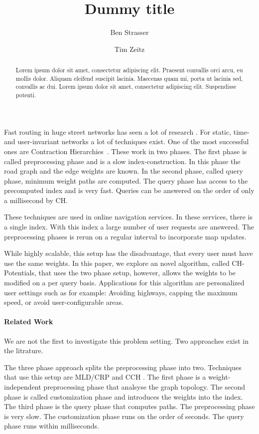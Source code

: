 \documentclass[a4paper,UKenglish,cleveref, autoref]{lipics-v2019}
\title{Dummy title} %
\author{Ben Strasser}{Dummy University Computing Laboratory, [optional: Address], Country \and My second affiliation, Country \and \url{http://www.myhomepage.edu} }{johnqpublic@dummyuni.org}{https://orcid.org/0000-0002-1825-0097}{(Optional) author-specific funding acknowledgements}%
\author{Tim Zeitz}{Institute of Theoretical Informatics, Algorithmics I, Karlsruhe Institute of Technology, Germany}{tim.zeitz@kit.edu}{}{}
\begin{document}
\maketitle

\begin{abstract}
Lorem ipsum dolor sit amet, consectetur adipiscing elit. Praesent convallis orci arcu, eu mollis dolor. Aliquam eleifend suscipit lacinia. Maecenas quam mi, porta ut lacinia sed, convallis ac dui. Lorem ipsum dolor sit amet, consectetur adipiscing elit. Suspendisse potenti.
\end{abstract}

Fast routing in huge street networks has seen a lot of research \cite{Survey}.
For static, time- and user-invariant networks a lot of techniques exist. 
One of the most successful ones are Contraction Hierarchies~\cite{CH}.
These work in two phases.
The first phase is called preprocessing phase and is a slow index-construction.
In this phase the road graph and the edge weights are known.
In the second phase, called query phase, minimum weight paths are computed.
The query phase has access to the precomputed index and is very fast.
Queries can be answered on the order of only a millisecond by CH.

These techniques are used in online navigation services. 
In these services, there is a single index.
With this index a large number of user requests are answered.
The preprocessing phases is rerun on a regular interval to incorporate map updates.

While highly scalable, this setup has the disadvantage, that every user must have use the same weights.
In this paper, we explore an novel algorithm, called CH-Potentials, that uses the two phase setup, however, allows the weights to be modified on a per query basis.
Applications for this algorithm are personalized user settings such as for example:
Avoiding highways, capping the maximum speed, or avoid user-configurable areas.

\paragraph{Related Work}

We are not the first to investigate this problem setting. 
Two approaches exist in the litrature.

The three phase approach splits the preprocessing phase into two.
Techniques that use this setup are MLD/CRP \cite{?} and CCH \cite{?}.
The first phase is a weight-independent preprocessing phase that analsyse the graph topology.
The second phase is called customization phase and introduces the weights into the index.
The third phase is the query phase that computes paths.
The preprocessing phase is very slow.
The customization phase runs on the order of seconds.
The query phase runs within milliseconds.
\end{document}
